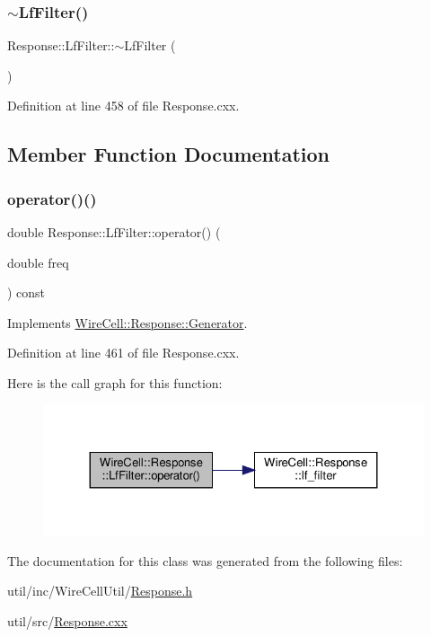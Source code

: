 \subsubsection{\texorpdfstring{$\sim$\+Lf\+Filter()}{~LfFilter()}}
{\footnotesize\ttfamily Response\+::\+Lf\+Filter\+::$\sim$\+Lf\+Filter (\begin{DoxyParamCaption}{ }\end{DoxyParamCaption})\hspace{0.3cm}{\ttfamily [virtual]}}



Definition at line 458 of file Response.\+cxx.



\subsection{Member Function Documentation}
\mbox{\label{class_wire_cell_1_1_response_1_1_lf_filter_a476aa965cb6af0ba6dada07d6558c856}} 
\subsubsection{\texorpdfstring{operator()()}{operator()()}}
{\footnotesize\ttfamily double Response\+::\+Lf\+Filter\+::operator() (\begin{DoxyParamCaption}\item[{double}]{freq }\end{DoxyParamCaption}) const\hspace{0.3cm}{\ttfamily [virtual]}}



Implements \hyperlink{class_wire_cell_1_1_response_1_1_generator_a216d7f7bd22a1a781b6b00bd988e0136}{Wire\+Cell\+::\+Response\+::\+Generator}.



Definition at line 461 of file Response.\+cxx.

Here is the call graph for this function\+:
\nopagebreak
\begin{figure}[H]
\begin{center}
\leavevmode
\includegraphics[width=324pt]{class_wire_cell_1_1_response_1_1_lf_filter_a476aa965cb6af0ba6dada07d6558c856_cgraph}
\end{center}
\end{figure}


The documentation for this class was generated from the following files\+:\begin{DoxyCompactItemize}
\item 
util/inc/\+Wire\+Cell\+Util/\hyperlink{_response_8h}{Response.\+h}\item 
util/src/\hyperlink{_response_8cxx}{Response.\+cxx}\end{DoxyCompactItemize}

